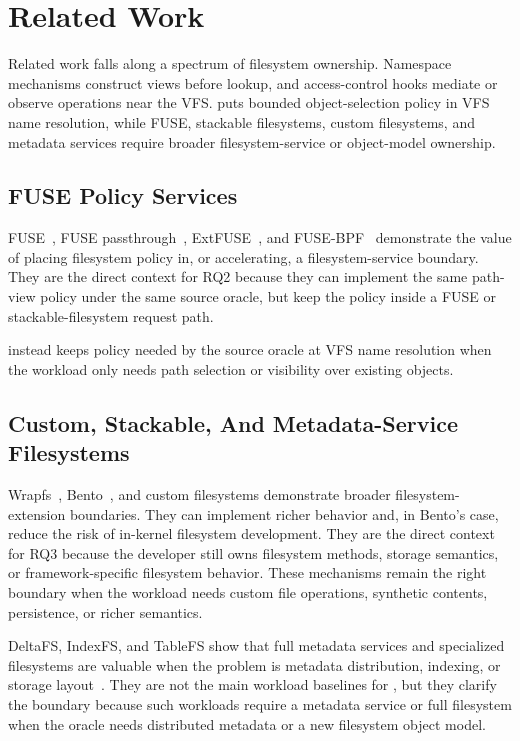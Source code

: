 \section{Related Work}
\label{sec:related-work}

Related work falls along a spectrum of filesystem ownership. Namespace
mechanisms construct views before lookup, and access-control hooks mediate or
observe operations near the VFS. \namei puts bounded object-selection policy in
VFS name resolution, while FUSE, stackable filesystems, custom filesystems, and
metadata services require broader filesystem-service or object-model ownership.

\subsection{FUSE Policy Services}

FUSE~\cite{linux_fuse}, FUSE passthrough~\cite{linux_fuse_passthrough},
ExtFUSE~\cite{extfuse}, and FUSE-BPF~\cite{fuse_bpf_patch} demonstrate the
value of placing filesystem policy in, or accelerating, a filesystem-service
boundary. They are the direct context for RQ2 because they can implement the
same path-view policy under the same source oracle, but keep the policy inside a
FUSE or stackable-filesystem request path.

\namei instead keeps policy needed by the source oracle at VFS name resolution
when the workload only needs path selection or visibility over existing
objects.

\subsection{Custom, Stackable, And Metadata-Service Filesystems}

Wrapfs~\cite{wrapfs}, Bento~\cite{bento}, and custom filesystems demonstrate
broader filesystem-extension boundaries. They can implement richer behavior and,
in Bento's case, reduce the risk of in-kernel filesystem development. They are
the direct context for RQ3 because the developer still owns filesystem methods,
storage semantics, or framework-specific filesystem behavior. These mechanisms
remain the right boundary when the workload needs custom file operations,
synthetic contents, persistence, or richer semantics.

DeltaFS, IndexFS, and TableFS show that full metadata services and specialized
filesystems are valuable when the problem is metadata distribution, indexing,
or storage layout~\cite{deltafs_sc21,indexfs,tablefs}. They are not the main
workload baselines for \namei, but they clarify the boundary because such
workloads require a metadata service or full filesystem when the oracle needs
distributed metadata or a new filesystem object model.

